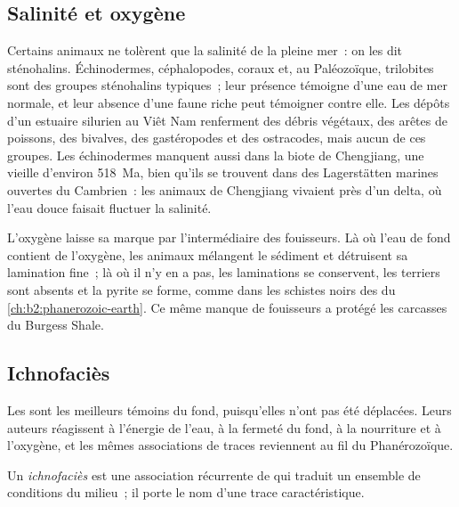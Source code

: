 \subsection*{Salinité et oxygène}

Certains animaux ne tolèrent que la salinité de la pleine mer~: on les dit sténohalins. Échinodermes,
céphalopodes, coraux et, au Paléozoïque, trilobites sont des groupes sténohalins typiques~; leur présence témoigne
d'une eau de mer normale, et leur absence d'une faune riche peut témoigner contre elle. Les dépôts d'un estuaire
silurien au Viêt Nam renferment des débris végétaux, des arêtes de poissons, des bivalves, des gastéropodes
et des ostracodes, mais aucun de ces groupes. Les échinodermes manquent aussi dans la biote de Chengjiang,
une  vieille d'environ 518~Ma, bien qu'ils se trouvent dans des Lagerstätten marines ouvertes du
Cambrien~: les animaux de Chengjiang vivaient près d'un delta, où l'eau douce faisait fluctuer la salinité.

L'oxygène laisse sa marque par l'intermédiaire des fouisseurs. Là où l'eau de fond contient
de l'oxygène, les animaux mélangent le sédiment et détruisent sa lamination fine~; là où
il n'y en a pas, les laminations se conservent, les terriers sont absents et la pyrite se
forme, comme dans les schistes noirs des  du
\cref{ch:b2:phanerozoic-earth}. Ce même manque de fouisseurs a protégé les carcasses du Burgess Shale.

\subsection*{Ichnofaciès}

Les  sont les meilleurs témoins du fond, puisqu'elles n'ont pas été déplacées.
Leurs auteurs réagissent à l'énergie de l'eau, à la fermeté du fond, à la nourriture
et à l'oxygène, et les mêmes associations de traces reviennent au fil du Phanérozoïque.

\begin{definition}[Ichnofaciès]\label{def:b2:palaeoenvironments:ichnofacies} Un
\emph{ichnofaciès} est une association récurrente de  qui
traduit un ensemble de conditions du milieu~; il porte le nom d'une trace caractéristique.
\end{definition}


